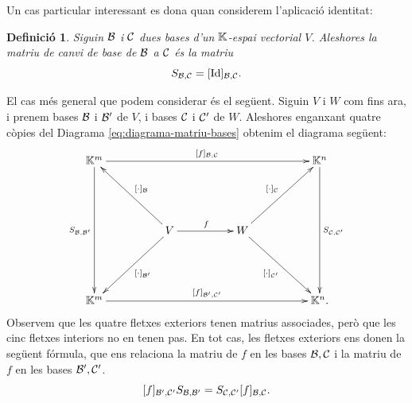 \documentclass[
  11pt,
]{book}
\numberwithin{dummy}{section}
\theoremstyle{maincolornumbox}
\theoremstyle{blacknumex}
\theoremstyle{blacknumbox}
\newtheorem{definitionT}{Definició}[chapter]
\theoremstyle{maincolornum}
\newenvironment{definition}{\begin{dBox}\begin{definitionT}}{\end{definitionT}\end{dBox}}
\newlength\esp
\begin{document}
Un cas particular interessant es dona quan considerem l'aplicació
identitat:

\begin{definition}
Siguin \(\mathcal{B}\) i \(\mathcal{C}\) dues bases d'un \(\mathbb{K}\)-espai vectorial \(V\).
Aleshores la \emph{matriu de canvi de base} de \(\mathcal{B}\) a \(\mathcal{C}\) és la matriu
\[S_{\mathcal{B},\mathcal{C}} = [\operatorname{Id}]_{\mathcal{B},\mathcal{C}}.\]
\end{definition}

El cas més general que podem considerar és el següent. Siguin \(V\) i \(W\)
com fins ara, i prenem bases \(\mathcal{B}\) i \(\mathcal{B}'\) de \(V\), i bases \(\mathcal{C}\)
i \(\mathcal{C}'\) de \(W\). Aleshores enganxant quatre còpies del
Diagrama \eqref{eq:diagrama-matriu-bases} obtenim el diagrama següent:
\[\xymatrix@C50pt@R50pt{
\K^m\ar[rrr]^{[f]_{\calb,\calc}}\ar[dd]_{S_{\calb,\calb'}}&&& \K^n\ar[dd]^{S_{\calc,\calc'}}\\
&V\ar[r]^f\ar[ul]_{[\cdot]_\calb}\ar[dl]^{[\cdot]_{\calb'}}&W\ar[ur]^{[\cdot]_{\calc}}\ar[dr]_{[\cdot]_{\calc'}}\\
\K^m\ar[rrr]^{[f]_{\calb',\calc'}}&&&\K^n.
}\] Observem que les quatre fletxes exteriors tenen matrius associades,
però que les cinc fletxes interiors no en tenen pas. En tot cas, les
fletxes exteriors ens donen la següent fórmula, que ens relaciona la
matriu de \(f\) en les bases \(\mathcal{B},\mathcal{C}\) i la matriu de \(f\) en les bases
\(\mathcal{B}',\mathcal{C}'\).
\[[f]_{\mathcal{B}',\mathcal{C}'} S_{\mathcal{B},\mathcal{B}'} = S_{\mathcal{C},\mathcal{C}'} [f]_{\mathcal{B},\mathcal{C}}.\]
\end{document}
